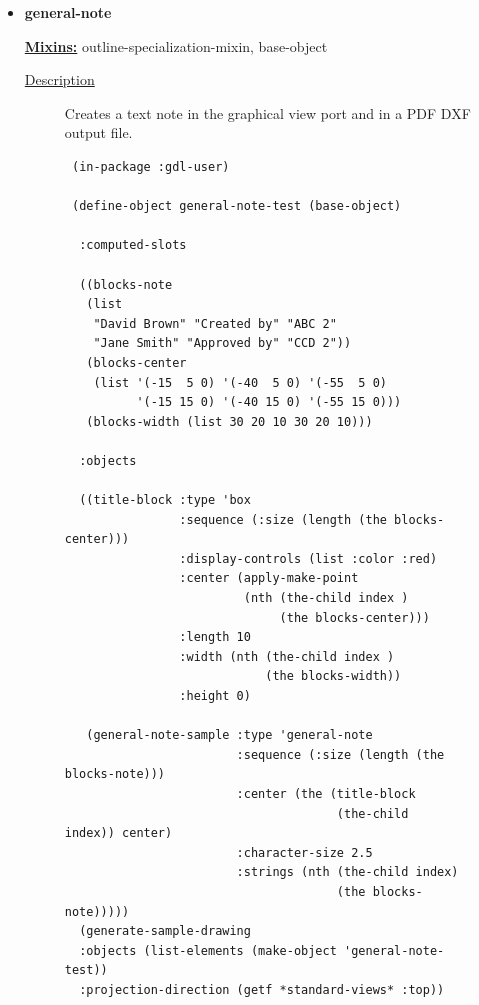 \documentclass [11pt]{book}
\begin{document}
\begin{itemize}
\item {}
\label{prim:general-note}
\textbf{general-note}


\textbf{
\underline{Mixins:}} outline-specialization-mixin, base-object





\begin{description}

\item [
\underline{Description}]


Creates a text note in the graphical view port and in a PDF DXF output file.



\end{description}




\begin{figure}
\begin{lrbox}{\boxedverb}
\begin{minipage}{\linewidth}
{\small

\begin{verbatim} 
 (in-package :gdl-user)

 (define-object general-note-test (base-object)
  
  :computed-slots
  
  ((blocks-note 
   (list
    "David Brown" "Created by" "ABC 2"
    "Jane Smith" "Approved by" "CCD 2"))
   (blocks-center 
    (list '(-15  5 0) '(-40  5 0) '(-55  5 0)
          '(-15 15 0) '(-40 15 0) '(-55 15 0)))
   (blocks-width (list 30 20 10 30 20 10)))
  
  :objects 
  
  ((title-block :type 'box
                :sequence (:size (length (the blocks-center)))
                :display-controls (list :color :red)
                :center (apply-make-point 
                         (nth (the-child index ) 
                              (the blocks-center)))
                :length 10
                :width (nth (the-child index ) 
                            (the blocks-width))
                :height 0)

   (general-note-sample :type 'general-note
                        :sequence (:size (length (the blocks-note)))
                        :center (the (title-block 
                                      (the-child index)) center)
                        :character-size 2.5
                        :strings (nth (the-child index) 
                                      (the blocks-note)))))
  (generate-sample-drawing 
  :objects (list-elements (make-object 'general-note-test)) 
  :projection-direction (getf *standard-views* :top))



\end{verbatim}}
\end{minipage}
\end{lrbox}
\end{figure}
\end{itemize}
\end{document}
